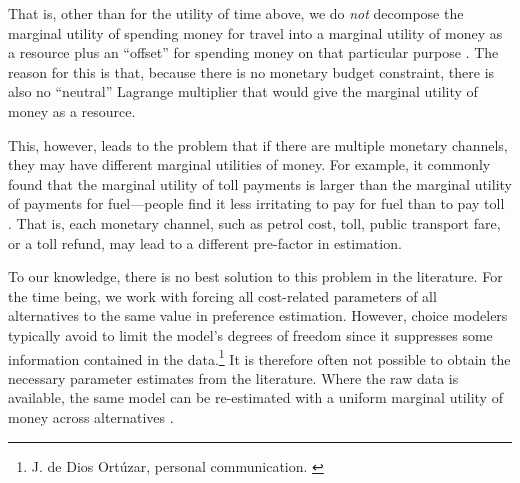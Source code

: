 That is, other than for the utility of time above, we do \emph{not} decompose the  marginal utility of spending money for travel into a marginal utility of money as a resource plus an ``offset'' for spending money on that particular purpose \citep[for an example of this decomposition, see, e.g.][]{MunizagaEtAl2012TimeAllocationModeChoice}.  The reason for this is that, because there is no monetary budget constraint, there is also no ``neutral'' Lagrange multiplier that would give the marginal utility of money as a resource.

This, however, leads to the problem that if there are multiple monetary channels, they may have different marginal utilities of money.  For example, it commonly found that the marginal utility of toll payments is larger than the marginal utility of payments for fuel---\ie people find it less irritating to pay for fuel than to pay toll 
%
%
\citep[see, e.g.,][]{VrticEtc2008ReisekostenSVIBericht}.
%
That is, each monetary channel, such as petrol cost, toll, public transport fare, or a 
toll refund, may lead to a different pre-factor in estimation.

To our knowledge, there is no best solution to this problem in the literature.  For the time being, we work with forcing all cost-related parameters of all alternatives to the same value in preference estimation.
%
However, choice modelers typically avoid to limit the model's degrees of freedom since it suppresses some information contained in the data.\footnote{%
%
J. de Dios Ort\'uzar, personal communication.
%
\label{fn:ortuzar-pers-com}}
%
It is therefore often not possible to obtain the necessary parameter estimates from the literature. Where the raw data is available, the same model can be re-estimated with a uniform marginal utility of money across alternatives
\citep[see, e.g.,][]{KickhoeferEtAl2011PolicyEvaluationIncome, TirachiniEtAl2012CrowdingCongestion}.

